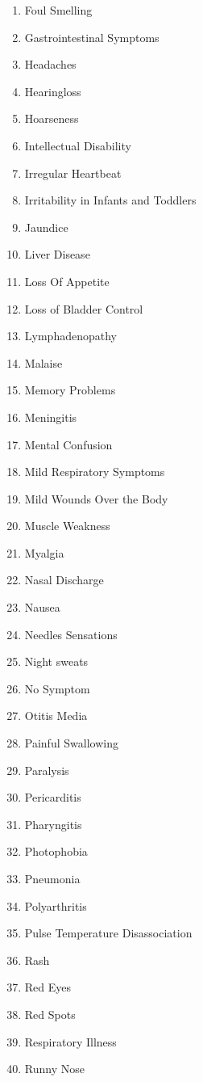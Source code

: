 \documentclass{article}
\begin{document}
\begin{multicols}{2}
\begin{enumerate}
    \item Foul Smelling
    \item Gastrointestinal Symptoms
    \item Headaches
    \item Hearingloss
    \item Hoarseness
    \item Intellectual Disability
    \item Irregular Heartbeat
    \item Irritability in Infants and Toddlers
    \item Jaundice
    \item Liver Disease
    \item Loss Of Appetite
    \item Loss of Bladder Control
    \item Lymphadenopathy
    \item Malaise
    \item Memory Problems
    \item Meningitis
    \item Mental Confusion
    \item Mild Respiratory Symptoms
    \item Mild Wounds Over the Body
    \item Muscle Weakness
    \item Myalgia
    \item Nasal Discharge
    \item Nausea
    \item Needles Sensations
    \item Night sweats
    \item No Symptom
    \item Otitis Media
    \item Painful Swallowing
    \item Paralysis
    \item Pericarditis
    \item Pharyngitis
    \item Photophobia
    \item Pneumonia
    \item Polyarthritis
    \item Pulse Temperature Disassociation
    \item Rash
    \item Red Eyes
    \item Red Spots
    \item Respiratory Illness
    \item Runny Nose

\end{enumerate}
\end{multicols}
\end{document}
